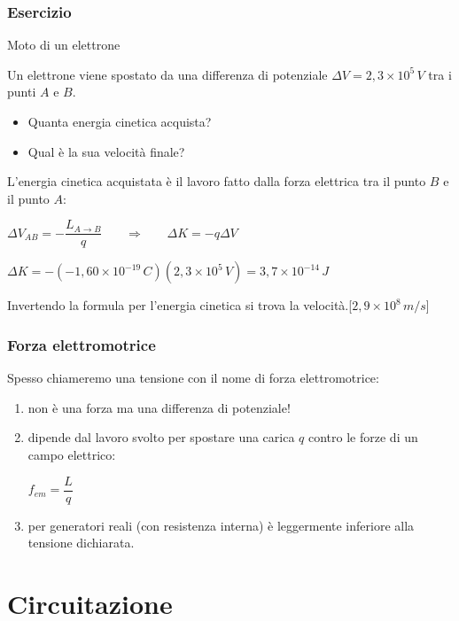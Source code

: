 \documentclass[handout]{beamer}
\theoremstyle{plain}
\newcommand{\fem}{f_{em}}
\begin{document}
\begin{frame}
\frametitle{Esercizio}

\begin{exampleblock}{Moto di un elettrone}
{\small Un elettrone  viene spostato da una differenza di potenziale $ \Delta V = 2,3 \times 10^5 \, V $ tra i punti $ A $ e $ B $.
\begin{itemize}
  \item Quanta energia cinetica acquista?
  \item Qual è la sua velocità finale?
\end{itemize}}
\end{exampleblock}
\pause
L'energia cinetica acquistata è il lavoro fatto dalla forza elettrica tra il punto $ B $ e il punto $ A $:
\begin{center}
$ \Delta V_{AB} = - \dfrac{L_{A \to B}}{q} $~~~ $ \Longrightarrow  $ ~~~$ \Delta K = -q \Delta V  $\pause

$ \Delta K = - (-1,60 \times 10^{-19} \, C) (2,3 \times 10 ^5 \, V) = 3,7 \times 10^{-14} \, J $
\end{center}\pause
Invertendo la formula per l'energia cinetica si trova la velocità.\hspace*{\fill}[$ 2,9 \times 10^{8} \, m/s $]
\end{frame}

\begin{frame}
\frametitle{Forza elettromotrice}
Spesso chiameremo una tensione con il nome di \alert<1>{forza elettromotrice}:\pause
\begin{enumerate}
  \item non è una forza ma una differenza di potenziale!\pause
  \item dipende dal lavoro svolto per spostare una carica $ q $ contro le forze di un campo elettrico:
  \begin{center}
  \colorbox{blue!30}{$ \fem = \dfrac{L}{q}$}
  \end{center}\pause
  \item per generatori reali (con resistenza interna) è leggermente inferiore alla tensione dichiarata.
\end{enumerate}
\end{frame}








\section{Circuitazione}
\end{document}
